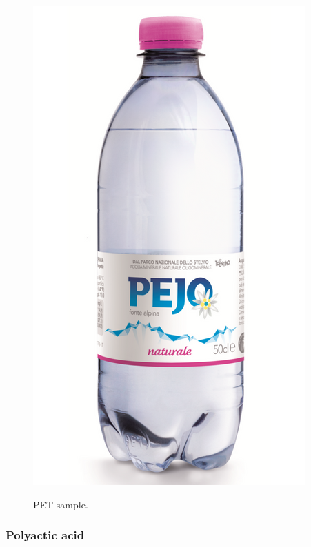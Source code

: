 \documentclass[a4paper, 11pt]{article}
\begin{document}
\begin{figure}[htp]
	\centering
	{\includegraphics[scale=0.15]{PET}}
	\captionsetup{justification=centering}
	\caption{PET sample.}
	\label{fig:PET}
\end{figure}

\subsubsection{Polyactic acid}
\end{document}

